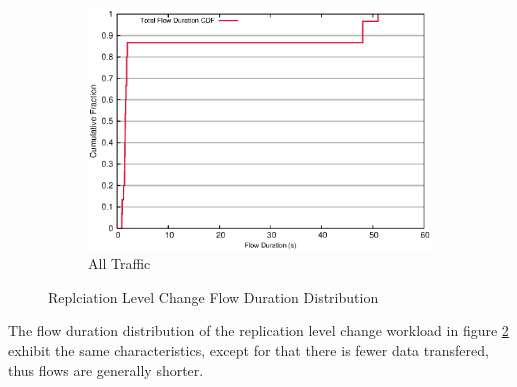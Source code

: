 \begin{figure}[!htbp]
\begin{subfigure}[b]{.55\linewidth}
	\includegraphics[width=.99\textwidth]{figures/replica_change/flow_duration.eps}
	\caption{All Traffic}\label{fig:read_duration:all}
   \end{subfigure}%
\caption{Replciation Level Change Flow Duration Distribution}
\label{fig:replica_duration}
\end{figure}

The flow duration distribution of the replication level change workload in figure \ref{fig:replica_duration} exhibit the same characteristics, except for that there is fewer data transfered, thus flows are generally shorter. 

